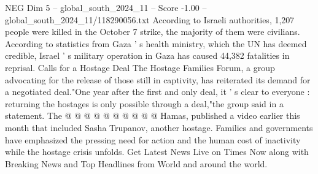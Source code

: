 \begin{textsample}{NEG Dim 5 – global\_south\_2024\_11 – Score -1.00 – global\_south\_2024\_11/118290056.txt}
According to Israeli authorities, 1,207 people were killed in the October 7 strike, the majority of them were civilians.
According to statistics from Gaza ' s health ministry, which the UN has deemed credible, Israel ' s military operation in Gaza has caused 44,382 fatalities in reprisal.
Calls for a Hostage Deal The Hostage Families Forum, a group advocating for the release of those still in captivity, has reiterated its demand for a negotiated deal."One year after the first and only deal, it ' s clear to everyone : returning the hostages is only possible through a deal,"the group said in a statement.
The @ @ @ @ @ @ @ @ @ @ Hamas, published a video earlier this month that included Sasha Trupanov, another hostage.
Families and governments have emphasized the pressing need for action and the human cost of inactivity while the hostage crisis unfolds.
Get Latest News Live on Times Now along with Breaking News and Top Headlines from World and around the world.

\end{textsample}
